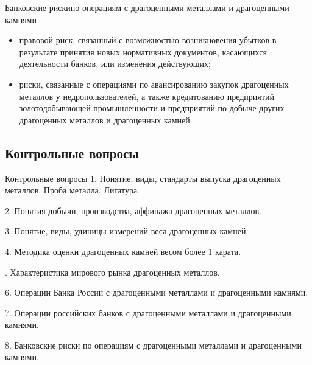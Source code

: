 \documentclass[_Banking_p3.tex]{subfiles}
\begin{document}
\begin{frame} {Банковские риски}{по операциям с драгоценными металлами и драгоценными камнями}
\begin{itemize}[<+->]
\item
правовой риск, связанный с возможностью возникновения убытков в результате принятия новых нормативных документов, касающихся деятельности банков, или изменения действующих;

\item
риски, связанные с операциями по авансированию закупок драгоценных металлов у недропользователей, а также кредитованию предприятий золотодобывающей промышленности и предприятий по добыче других драгоценных металлов и драгоценных камней.
\end{itemize}
\end{frame}



\subsection{Контрольные вопросы}
\begin{frame}[ allowframebreaks ]{Контрольные вопросы}
1. Понятие, виды, стандарты выпуска драгоценных металлов. Проба металла. Лигатура.

2. Понятия добычи, производства, аффинажа драгоценных металлов.

3. Понятие, виды, удиницы измерений веса драгоценных камней. 

4. Методика оценки драгоценных камней весом более 1 карата.

. Характеристика мирового рынка драгоценных металлов.

6. Операции Банка России с драгоценными металлами и драгоценными камнями.

7. Операции российских банков с драгоценными металлами и драгоценными камнями.

8. Банковские риски по операциям с драгоценными металлами и драгоценными камнями.
\end{frame}

\end{document}

